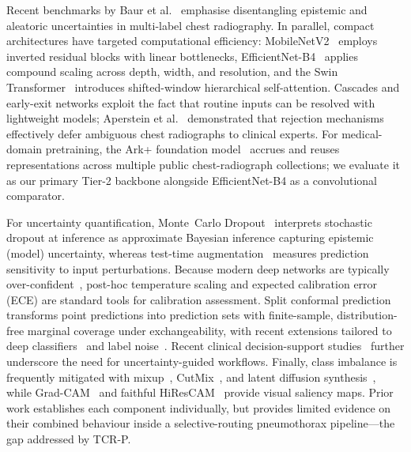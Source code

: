 \documentclass[diagnostics,article,submit,moreauthors]{Definitions/mdpi}
\begin{document}
Recent benchmarks by Baur et al.~\cite{baur2025benchmarking} emphasise disentangling epistemic and aleatoric uncertainties in multi-label chest radiography. In parallel, compact architectures have targeted computational efficiency: MobileNetV2~\cite{sandler2018mobilenetv2, sharma2025mobilenetv2} employs inverted residual blocks with linear bottlenecks, EfficientNet-B4~\cite{tan2019efficientnet, chen2026efficientnet} applies compound scaling across depth, width, and resolution, and the Swin Transformer~\cite{liu2021swin} introduces shifted-window hierarchical self-attention. Cascades and early-exit networks exploit the fact that routine inputs can be resolved with lightweight models; Aperstein et al.~\cite{aperstein2025multipathology} demonstrated that rejection mechanisms effectively defer ambiguous chest radiographs to clinical experts. For medical-domain pretraining, the Ark+ foundation model~\cite{ma2025arkplus} accrues and reuses representations across multiple public chest-radiograph collections; we evaluate it as our primary Tier-2 backbone alongside EfficientNet-B4 as a convolutional comparator.

For uncertainty quantification, Monte~Carlo Dropout~\cite{gal2016dropout} interprets stochastic dropout at inference as approximate Bayesian inference capturing epistemic (model) uncertainty, whereas test-time augmentation~\cite{wang2019aleatoric} measures prediction sensitivity to input perturbations. Because modern deep networks are typically over-confident~\cite{guo2017calibration}, post-hoc temperature scaling and expected calibration error (ECE) are standard tools for calibration assessment. Split conformal prediction~\cite{vovk2005algorithmic, shafer2008tutorial} transforms point predictions into prediction sets with finite-sample, distribution-free marginal coverage under exchangeability, with recent extensions tailored to deep classifiers~\cite{romano2020classification, angelopoulos2021uncertainty, angelopoulos2023gentle} and label noise~\cite{penso2025conformal}. Recent clinical decision-support studies~\cite{gupta2026calibrated} further underscore the need for uncertainty-guided workflows. Finally, class imbalance is frequently mitigated with mixup~\cite{zhang2018mixup}, CutMix~\cite{yun2019cutmix}, and latent diffusion synthesis~\cite{rombach2022high}, while Grad-CAM~\cite{selvaraju2017gradcam} and faithful HiResCAM~\cite{draelos2020hirescam} provide visual saliency maps. Prior work establishes each component individually, but provides limited evidence on their combined behaviour inside a selective-routing pneumothorax pipeline---the gap addressed by TCR-P.
\end{document}
